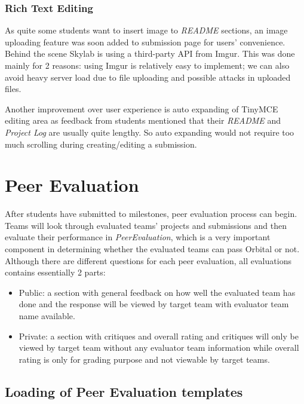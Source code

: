 \subsubsection{Rich Text Editing}

As quite some students want to insert image to \textit{README} sections, an image uploading feature was soon added to submission page for users' convenience. Behind the scene Skylab is using a third-party API from Imgur. This was done mainly for 2 reasons: using Imgur is relatively easy to implement; we can also avoid heavy server load due to file uploading and possible attacks in uploaded files.

Another improvement over user experience is auto expanding of TinyMCE editing area as feedback from students mentioned that their \textit{README} and \textit{Project Log} are usually quite lengthy. So auto expanding would not require too much scrolling during creating/editing a submission.

\section{Peer Evaluation} \label{peerevaluation}
 
 After students have submitted to milestones, peer evaluation process can begin. Teams will look through evaluated teams' projects and submissions and then evaluate their performance in \textit{PeerEvaluation}, which is a very important component in determining whether the evaluated teams can pass Orbital or not. Although there are different questions for each peer evaluation, all evaluations contains essentially 2 parts:

 \begin{itemize}
  \item Public: a section with general feedback on how well the evaluated team has done and the response will be viewed by target team with evaluator team name available.
  \item Private: a section with critiques and overall rating and critiques will only be viewed by target team without any evaluator team information while overall rating is only for grading purpose and not viewable by target teams.
\end{itemize}

\subsection{Loading of Peer Evaluation templates}


